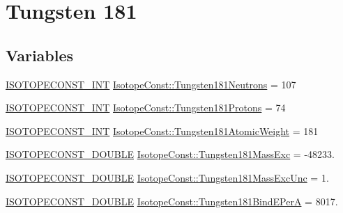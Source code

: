 \hypertarget{group___isotope_const-_tungsten-_w181}{}\section{Tungsten 181}
\label{group___isotope_const-_tungsten-_w181}
\subsection*{Variables}
\begin{DoxyCompactItemize}
\item 
\mbox{\hyperlink{group___isotope_const-_macros_ga5f18360b3e99483a35c32d789e62621c}{I\+S\+O\+T\+O\+P\+E\+C\+O\+N\+S\+T\+\_\+\+I\+NT}} \mbox{\hyperlink{group___isotope_const-_tungsten-_w181_gad2ac333d3e57d102f51a3dc997877292}{Isotope\+Const\+::\+Tungsten181\+Neutrons}} = 107
\item 
\mbox{\hyperlink{group___isotope_const-_macros_ga5f18360b3e99483a35c32d789e62621c}{I\+S\+O\+T\+O\+P\+E\+C\+O\+N\+S\+T\+\_\+\+I\+NT}} \mbox{\hyperlink{group___isotope_const-_tungsten-_w181_gab2d544bf8bb2a2d4b8b4a9b37cdca1b9}{Isotope\+Const\+::\+Tungsten181\+Protons}} = 74
\item 
\mbox{\hyperlink{group___isotope_const-_macros_ga5f18360b3e99483a35c32d789e62621c}{I\+S\+O\+T\+O\+P\+E\+C\+O\+N\+S\+T\+\_\+\+I\+NT}} \mbox{\hyperlink{group___isotope_const-_tungsten-_w181_gaf8ee6fce0ddf663d53826edbba492da0}{Isotope\+Const\+::\+Tungsten181\+Atomic\+Weight}} = 181
\item 
\mbox{\hyperlink{group___isotope_const-_macros_ga8f45a7272ce02c0b4c65c44636ed719a}{I\+S\+O\+T\+O\+P\+E\+C\+O\+N\+S\+T\+\_\+\+D\+O\+U\+B\+LE}} \mbox{\hyperlink{group___isotope_const-_tungsten-_w181_ga73d26323492a00d357004a4c07753d1d}{Isotope\+Const\+::\+Tungsten181\+Mass\+Exc}} = -\/48233.
\item 
\mbox{\hyperlink{group___isotope_const-_macros_ga8f45a7272ce02c0b4c65c44636ed719a}{I\+S\+O\+T\+O\+P\+E\+C\+O\+N\+S\+T\+\_\+\+D\+O\+U\+B\+LE}} \mbox{\hyperlink{group___isotope_const-_tungsten-_w181_gaf5abdbb5cbf874055d42e4a01fb1358c}{Isotope\+Const\+::\+Tungsten181\+Mass\+Exc\+Unc}} = 1.
\item 
\mbox{\hyperlink{group___isotope_const-_macros_ga8f45a7272ce02c0b4c65c44636ed719a}{I\+S\+O\+T\+O\+P\+E\+C\+O\+N\+S\+T\+\_\+\+D\+O\+U\+B\+LE}} \mbox{\hyperlink{group___isotope_const-_tungsten-_w181_ga874b22fe60e7836d49a97e643b9f2215}{Isotope\+Const\+::\+Tungsten181\+Bind\+E\+PerA}} = 8017.
\item 

\end{DoxyCompactItemize}
